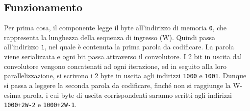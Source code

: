 \documentclass{article}
\begin{document}
\subsection{Funzionamento}
Per prima cosa, il componente legge il byte all'indirizzo di memoria \verb^0^, che rappresenta la lunghezza della sequenza di ingresso (W).
Quindi passa all'indirizzo \verb^1^, nel quale è contenuta la prima parola da codificare. 
La parola viene serializzata e ogni bit passa attraverso il convolutore.
I 2 bit in uscita dal convolutore vengono concatenati ad ogni iterazione, ed in seguito alla loro parallelizzazione, si scrivono i 2 byte in uscita agli indirizzi \verb^1000^ e \verb^1001^. 
Dunque si passa a leggere la seconda parola da codificare, finché non si raggiunge la W-esima parola, i cui  byte di uscita corrispondenti saranno scritti agli indirizzi \verb^1000+2W-2^ e \verb^1000+2W-1^.
\end{document}
